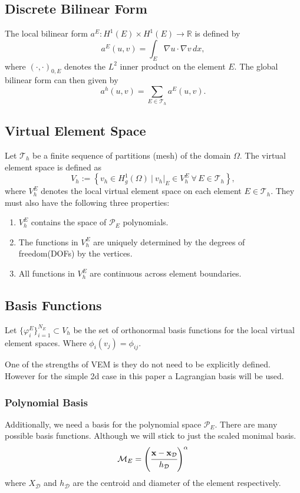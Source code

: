 \documentclass{report}
\begin{document}
\subsection{Discrete Bilinear Form}
The local bilinear form $a^E: H^1(E) \times H^1(E) \rightarrow \mathbb{R}$ is defined by
$$
a^E(u, v) = \int_E \nabla u \cdot \nabla v \, dx,
$$
where $(\cdot, \cdot)_{0,E}$ denotes the $L^2$ inner product on the element $E$. The global bilinear form can then given by
$$
a^h(u, v) = \sum_{E \in \mathcal{T}_h} a^E(u, v).
$$


\subsection{Virtual Element Space}
Let $\mathcal{T}_h$ be a finite sequence of partitions (mesh) of the domain $\Omega$. The virtual element space is defined as
$$
V_h := \left\{ v_h \in H^1_g(\Omega) \ \bigg| \ v_h|_E \in V_h^E \ \forall \, E \in \mathcal{T}_h \right\},
$$
where $V_h^E$ denotes the local virtual element space on each element $E \in \mathcal{T}_h$. They must also have the following three properties:
\begin{enumerate}
    \item $V^E_h$ contains the space of $\mathcal{P}_E$ polynomials.

    \item The functions in $V^E_h$ are uniquely determined by the degrees of freedom(DOFs) by the vertices. %

    \item All functions in $V^E_h$ are continuous across element boundaries.
\end{enumerate}
\cite{sutton2017virtual}


\subsection{Basis Functions}
Let $\{\varphi_i^E\}_{i=1}^{N_E} \subset V_h$ be the set of orthonormal basis functions for the local virtual element spaces. Where $\phi_i(v_j) = \phi_{ij}.$

One of the strengths of VEM is they do not need to be explicitly defined. However for the simple 2d case in this paper a Lagrangian basis will be used.

\subsubsection{Polynomial Basis}
Additionally, we need a basis for the polynomial space $\mathcal{P}_E$. There are many possible basis functions. Although we will stick to just the scaled monimal basis.
\begin{equation}
    \mathcal{M}_E = \left(\cfrac{\mathbf{x} - \mathbf{x}_{\mathcal{D}}}{h_{\mathcal{D}}}\right)^{\alpha}
\end{equation}
where $X_{\mathcal{D}}$ and $h_{\mathcal{D}}$ are the centroid and diameter of the element respectively.
\end{document}
